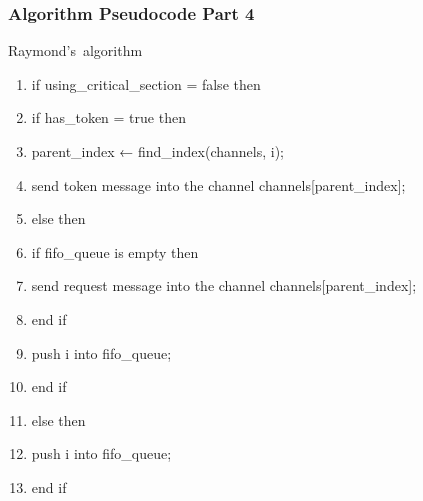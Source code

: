 \documentclass[11pt]{beamer}              %
\begin{document}
\begin{frame}
\frametitle{Algorithm Pseudocode Part 4}

\begin{center}
\begin{algorithm}[H]
	\scriptsize
	\def\algorithmlabel{Raymond's}
    \caption{\algorithmlabel\ algorithm}
    \label{alg:raymondsalgorithm}
    \begin{algorithmic}[1]
            \begin{enumerate}
                \item if using\_critical\_section = false then
                \item \quad if has\_token = true then
                \item \quad\quad parent\_index ← find\_index(channels, i);
                \item \quad\quad send token message into the channel channels[parent\_index];
                \item \quad else then
                \item \quad\quad if fifo\_queue is empty then
                \item \quad\quad\quad send request message into the channel channels[parent\_index];
                \item \quad\quad end if
                \item \quad\quad push i into fifo\_queue;
                \item \quad end if
                \item else then
                \item \quad push i into fifo\_queue;
                \item end if
            \end{enumerate}

    \end{algorithmic}
\end{algorithm}
\end{center}
\end{frame}
\end{document}
